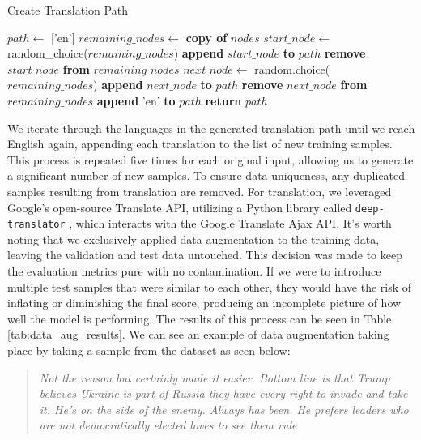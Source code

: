 \begin{algorithm}[H]
    \caption{Create Translation Path}
    \begin{algorithmic}[1]
        \State $path \gets $ ['en']
        \State $remaining\_nodes \gets $ \textbf{copy of} $nodes$
        \State
        \State $start\_node \gets $ random\_choice($remaining\_nodes$)
        \State \textbf{append} $start\_node$ \textbf{to} $path$
        \State \textbf{remove} $start\_node$ \textbf{from} $remaining\_nodes$
        \State
        \State $next\_node \gets $ random.choice($remaining\_nodes$)
        \State \textbf{append} $next\_node$ \textbf{to} $path$
        \State \textbf{remove} $next\_node$ \textbf{from} $remaining\_nodes$
        \EndWhile
        \State
        \State \textbf{append} 'en' \textbf{to} $path$
        \State \textbf{return} $path$
        \EndFunction
    \end{algorithmic}
    \label{alg:translation_path}
\end{algorithm}

We iterate through the languages in the generated translation path until we reach English again, appending each translation to the list of new training samples. This process is repeated five times for each original input, allowing us to generate a significant number of new samples. To ensure data uniqueness, any duplicated samples resulting from translation are removed. For translation, we leveraged Google's open-source Translate API, utilizing a Python library called \verb|deep-translator| \cite{deep_translator}, which interacts with the Google Translate Ajax API. It's worth noting that we exclusively applied data augmentation to the training data, leaving the validation and test data untouched. This decision was made to keep the evaluation metrics pure with no contamination. If we were to introduce multiple test samples that were similar to each other, they would have the risk of inflating or diminishing the final score, producing an incomplete picture of how well the model is performing. The results of this process can be seen in Table \ref{tab:data_aug_results}. We can see an example of data augmentation taking place by taking a sample from the dataset as seen below:

\begin{quote}
    \textit{Not the reason but certainly made it easier. Bottom line is that Trump believes Ukraine is part of Russia they have every right to invade and take it. He's on the side of the enemy. Always has been. He prefers leaders who are not democratically elected loves to see them rule}
\end{quote}

